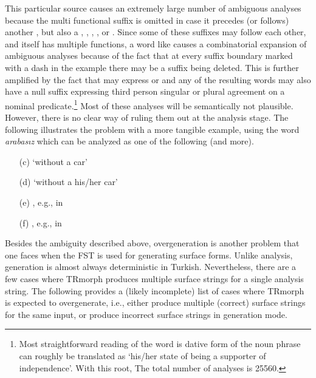 \documentclass[twocolumn]{article}
\begin{document}
\begin{enumerate}
This particular source causes an extremely large number of ambiguous
analyses because the multi functional suffix  is omitted in
case it precedes (or follows) another , but also a
, , , ,  or
. Since some of these suffixes may follow each other, and
 itself has multiple functions, a word like
 causes a combinatorial expansion of
ambiguous analyses because of the fact that at every suffix boundary
marked with a dash in the example there may be a  suffix
being deleted. This is further amplified by the fact that 
may express  or  and any of the resulting
words may also have a null suffix expressing third person singular or
plural agreement on a nominal predicate.\footnote{Most straightforward
reading of the word is dative form of the noun phrase can roughly be
translated as `his/her state of being a supporter of independence'.
With this root, The total number of analyses is 25560.} Most of
these analyses will be semantically not plausible. However, there is
no clear way of ruling them out at the analysis stage. The following
illustrates the problem with a more tangible example, using the word
\emph{arabasız} which can be analyzed as one of the following (and
more).

\begin{enumerate}
    \item[(c)]  `without a car'
    \item[(d)]  `without a his/her car'
    \item[(e)] , e.g., in 
    \item[(f)] , e.g., in 
\end{enumerate}

\end{enumerate}

Besides the ambiguity described above, overgeneration is another
problem that one faces when the FST is used for generating surface
forms. Unlike analysis, generation is almost always deterministic in
Turkish.
Nevertheless, there are a few cases where TRmorph produces multiple
surface strings for a single analysis string. The following provides a
(likely incomplete) list of cases where TRmorph is expected
to overgenerate, i.e., either produce multiple (correct) surface
strings for the same input, or produce incorrect surface strings in
generation mode.
\end{document}

